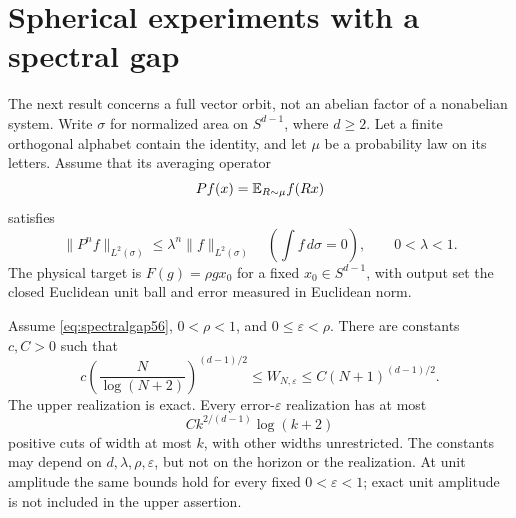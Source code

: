 \section{Spherical experiments with a spectral gap}\label{sec:nonabelian56}
The next result concerns a full vector orbit, not an abelian factor of a nonabelian system. Write $\sigma$ for normalized area on $S^{d-1}$, where $d\ge2$. Let a finite orthogonal alphabet contain the identity, and let $\mu$ be a probability law on its letters. Assume that its averaging operator
\[
                  Pf(x)=\mathbb E_{R\sim\mu}f(Rx)
\]
satisfies
\begin{equation}\label{eq:spectralgap56}
        \|P^n f\|_{L^2(\sigma)}\le\lambda^n\|f\|_{L^2(\sigma)}
        \quad\left(\int f\,d\sigma=0\right),\qquad 0<\lambda<1.
\end{equation}
The physical target is $F(g)=\rho g x_0$ for a fixed $x_0\in S^{d-1}$, with output set the closed Euclidean unit ball and error measured in Euclidean norm.

\begin{theorem}\label{thm:spherical56}
Assume \eqref{eq:spectralgap56}, $0<\rho<1$, and $0\le\varepsilon<\rho$. There are constants $c,C>0$ such that
\begin{equation}\label{eq:sphericalrate56}
 c\left(\frac{N}{\log(N+2)}\right)^{(d-1)/2}
       \le W_{N,\varepsilon}\le C(N+1)^{(d-1)/2}.
\end{equation}
The upper realization is exact. Every error-$\varepsilon$ realization has at most
\[
                      C k^{2/(d-1)}\log(k+2)
\]
positive cuts of width at most $k$, with other widths unrestricted. The constants may depend on $d,\lambda,\rho,\varepsilon$, but not on the horizon or the realization. At unit amplitude the same bounds hold for every fixed $0<\varepsilon<1$; exact unit amplitude is not included in the upper assertion.
\end{theorem}

